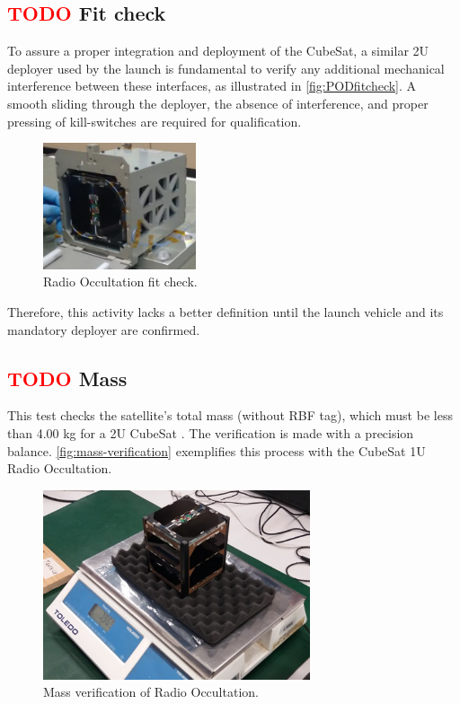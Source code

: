 \subsection{ \textcolor{red}{TODO} Fit check}

To assure a proper integration and deployment of the CubeSat, a similar 2U deployer used by the launch is fundamental to verify any additional mechanical interference between these interfaces, as illustrated in \autoref{fig:PODfitcheck}. A smooth sliding through the deployer, the absence of interference, and proper pressing of kill-switches are required for qualification.



\begin{figure}[!htb]
    \begin{center}
        \includegraphics[width=0.4\textwidth]{figures/fit-test.png}
        \caption{Radio Occultation fit check.}
        \label{fig:PODfitcheck}
    \end{center}
\end{figure}


Therefore, this activity lacks a better definition until the launch vehicle and its mandatory deployer are confirmed.

\subsection{ \textcolor{red}{TODO} Mass}

This test checks the satellite's total mass (without RBF tag), which must be less than 4.00 kg for a 2U CubeSat \cite{cds}. The verification is made with a precision balance. \autoref{fig:mass-verification} exemplifies this process with the CubeSat 1U Radio Occultation.

\begin{figure}[H]
    \begin{center}
        \includegraphics[width=0.7\textwidth]{figures/mass-test.png}
        \caption{Mass verification of Radio Occultation.}
        \label{fig:mass-verification}
    \end{center}
\end{figure}

